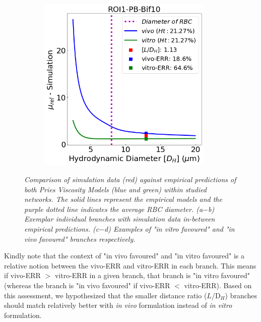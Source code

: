 \begin{figure}[H]
\begin{subfigure}{0.45 \textwidth}
    \caption{\textit{} \label{DeviationsViscosity3}}
\end{subfigure}
\hfill
\begin{subfigure}{0.45 \textwidth}
    \includegraphics[width=0.92\textwidth]{images/DeviationsViscosity4.png}
    \caption{\textit{} \label{DeviationsViscosity4}}
\end{subfigure}
\caption{\textit{Comparison of simulation data (red) against empirical predictions of both Pries Viscosity Models (blue and green) within studied networks. The solid lines represent the empirical models and the purple dotted line indicates the average RBC diameter. (a$-$b) Exemplar individual branches with simulation data in-between empirical predictions. (c$-$d) Examples of "in vitro favoured" and "in vivo favoured" branches respectively.} \label{DeviationsVisocity}}
\end{figure}

\noindent Kindly note that the context of "in vivo favoured" and "in vitro favoured" is a relative notion between the vivo-ERR and vitro-ERR in each branch. This means if vivo-ERR $>$ vitro-ERR in a given branch, that branch is "in vitro favoured" (whereas the branch is "in vivo favoured" if vivo-ERR $<$ vitro-ERR). Based on this assessment, we hypothesized that the smaller distance ratio ($L$/D$_{H}$) branches should match relatively better with \textit{in vivo} formulation instead of \textit{in vitro} formulation. \\

